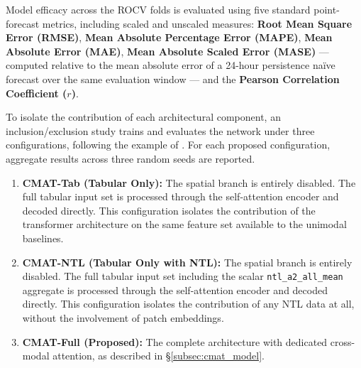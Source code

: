 Model efficacy across the ROCV folds is evaluated using five standard point-forecast metrics, including scaled and unscaled measures: \textbf{Root Mean Square Error (RMSE)}, \textbf{Mean Absolute Percentage Error (MAPE)}, \textbf{Mean Absolute Error (MAE)}, \textbf{Mean Absolute Scaled Error (MASE)} --- computed relative to the mean absolute error of a 24-hour persistence na\"ive forecast over the same evaluation window --- and the \textbf{Pearson Correlation Coefficient ($r$)}.

To isolate the contribution of each architectural component, an inclusion/exclusion study trains and evaluates the network under three configurations, following the example of \cite{wang_causal-aware_2025}. For each proposed configuration, aggregate results across three random seeds are reported.

\begin{enumerate}
    \item \textbf{CMAT-Tab (Tabular Only):} The spatial branch is entirely disabled. The full tabular input set is processed through the self-attention encoder and decoded directly. This configuration isolates the contribution of the transformer architecture on the same feature set available to the unimodal baselines.

    \item \textbf{CMAT-NTL (Tabular Only with NTL):} The spatial branch is entirely disabled. The full tabular input set including the scalar \texttt{ntl\_a2\_all\_mean} aggregate is processed through the self-attention encoder and decoded directly. This configuration isolates the contribution of any NTL data at all, without the involvement of patch embeddings.
    
    \item \textbf{CMAT-Full (Proposed):} The complete architecture with dedicated cross-modal attention, as described in §\ref{subsec:cmat_model}.
    
\end{enumerate}
